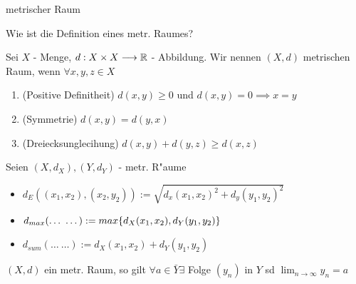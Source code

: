 \documentclass[class=article, crop=false]{standalone}
\begin{document}
\begin{zettel}{metrischer Raum}
\begin{flashcard}
\begin{question}
    Wie ist die Definition eines metr. Raumes?
\end{question}
\begin{definition}
    Sei $X$ - Menge, $d:X \times X \longrightarrow \mathbb{R}$ - Abbildung. Wir nennen $(X,d)$ metrischen Raum, wenn $\forall x,y,z \in X$ 
    \begin{enumerate}
        \item (Positive Definitheit) $d(x,y) \geq 0$ und $d(x,y)= 0 \implies x = y$ 
        \item (Symmetrie) $d(x,y) = d(y,x)$ 
        \item (Dreiecksunglecihung) $d(x,y) + d(y,z) \geq d(x,z)$ 
    \end{enumerate}
\end{definition}
\end{flashcard}

\begin{example}[Metriken]
Seien $ (X,d_X) , (Y,d_Y)  $ - metr. R"aume
\begin{itemize}
    \item $d_E ( (x_1,x_2) , (x_2,y_2)) := \sqrt{d_x (x_1,x_2)^2 + d_y (y_1,y_2)^2  }$ 
    \item $d_{max} (\dots\ \dots) := max \set{ d_X (x_1,x_2) , d_Y  (y_1,y_2) }$
    \item $d_{sum} (\dots\ \dots):= d_X (x_1,x_2) +  d_Y (y_1,y_2) $
\end{itemize}
\end{example}    

\begin{theorem}
   $(X,d)$ ein metr. Raum, so gilt $\forall a \in  \bar{Y} \exists $ Folge $(y_n )$ in $Y$ sd $\lim_{n \to \infty} y_n = a$ 
\end{theorem}

\end{zettel}
\end{document}
